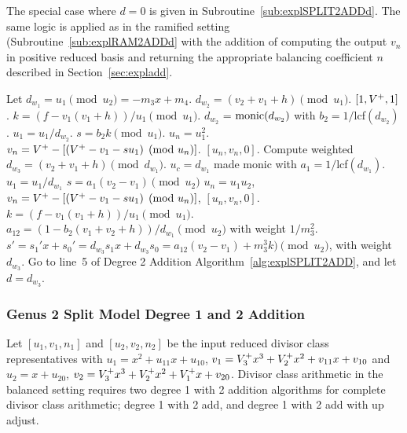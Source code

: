 The special case where $d=0$ is given in Subroutine~\ref{sub:explSPLIT2ADDd}.
The same logic is applied as in the ramified setting
(Subroutine~\ref{sub:explRAM2ADDd} with the addition of computing the output
$v_{n}$ in positive reduced basis and returning the appropriate balancing
coefficient $n$ described in Section~\ref{sec:expladd}.

\begin{subroutine}[htbp]
\caption{Genus 2 Split Model Degree 2 Addition $d = 0$ \label{sub:explSPLIT2ADDd}}
\begin{algorithmic} [1]
\State Let $d_{w_1} = u_1 \pmod{u_2} = -m_3x + m_4$.
    \State $d_{w_2} = (v_2 + v_1 + h) \pmod{u_1}$.
     \Return $[1,V^{+},1]$.
    \Else  
        \State $k = (f - v_1(v_1 + h))/u_1 \pmod{u_1}$.
        \State $d_{w_2}$ = $\operatorname{monic}(d_{w_2})$ with $b_2 = 1/$lcf$(d_{w_2})$.
        \State $u_1 = u_1/d_{w_2}$.
        \State $s = b_2k \pmod{u_1}$.
        \State $u_n = u_1^2$.
        \State $v_n = V^{+} - [(V^{+} - v_1 - su_1) \pmod{u_n}]$.
        \State \Return $[u_n,v_n,0]$.
    \EndIf
\Else 
    \State Compute weighted $d_{w_3} = (v_2 + v_1 + h) \pmod{d_{w_1}}$.
        \State $u_c = d_{w_1}$ made monic with $a_1 = 1/$lcf$(d_{w_1})$.
        \State $u_1 = u_1/d_{w_1}$
        \State $s = a_1(v_2 - v_1) \pmod{u_2}$
        \State $u_n = u_1u_2$, $v_n = V^{+} - [(V^{+} - v_1 - su_1) \pmod{u_n}]$, \Return $[u_n,v_n,0]$.
    \Else 
        \State $k = (f - v_1(v_1 + h))/u_1 \pmod{u_1}$.
        \State $a_{12} = (1 - b_2(v_1 + v_2 + h))/d_{w_1} \pmod{u_2}$ with weight $1/m_3^2$.
        \State $s' = s_1'x + s_0' = d_{w_3}s_1x + d_{w_3}s_0 = a_{12}(v_2 - v_1) + m_3^3k) \pmod{u_2}$, with weight $d_{w_3}$.
        \State Go to line~5 of Degree 2 Addition Algorithm~\ref{alg:explSPLIT2ADD}, and let $d = d_{w_3}$.
    \EndIf
\EndIf
\end{algorithmic}
\end{subroutine}


\subsubsection{Genus 2 Split Model Degree 1 and 2 Addition}
Let $[u_1,v_1,n_1]$ and $[u_2,v_2,n_2]$ be the input reduced divisor class
representatives with $u_1 = x^2 + u_{11}x + u_{10}$, $v_1 = V^{+}_3x^3 + V^{+}_2x^2
+ v_{11}x + v_{10}$ and $u_2 = x + u_{20}$, $v_2 = V^{+}_3x^3 + V^{+}_2x^2 + V^{+}_1x
+ v_{20}$. Divisor class arithmetic in the balanced setting requires two degree
1 with 2 addition algorithms for complete divisor class arithmetic; degree 1
with 2 add, and degree 1 with 2 add with up adjust. 

